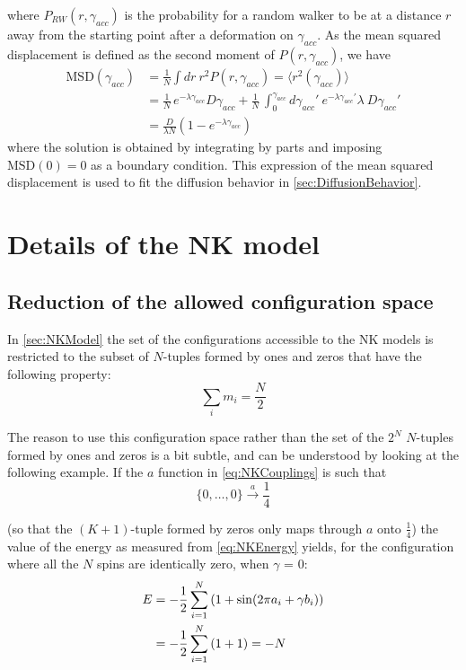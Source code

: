 where $P_{RW}(r, \gamma_{acc})$ is the probability for a random walker to be at a distance $r$ away from the starting point after a deformation on $\gamma_{acc}$.
As the mean squared displacement is defined as the second moment of $P(r,\gamma_{acc})$, we have 
\begin{align}
	\text{MSD}(\gamma_{acc})	&= \frac{1}{N} \int dr\ r^{2} P(r,\gamma_{acc}) = \langle r^{2}(\gamma_{acc}) \rangle \\
								&= \frac{1}{N}\, e^{-\lambda \gamma_{acc}} D \gamma_{acc} + \frac{1}{N}\, \int_{0}^{\gamma_{acc}} d\gamma_{acc}'\ e^{-\lambda \gamma_{acc}'} \lambda\ D \gamma_{acc}' \\
								&= \frac{D}{\lambda N} (1 - e^{-\lambda \gamma_{acc}})
\end{align}
where the solution is obtained by integrating by parts and imposing $\text{MSD}(0) = 0$ as a boundary condition. This expression of the mean squared displacement is used to fit the diffusion behavior in \autoref{sec:DiffusionBehavior}.

\chapter{Details of the NK model \label{app:NKDetails}}

\section*{Reduction of the allowed configuration space}

In \autoref{sec:NKModel} the set of the configurations accessible to the NK models is restricted to the subset of $N$-tuples formed by ones and zeros that have the following property:
\begin{equation}
    \sum_{i} m_{i} = \frac{N}{2}
    \label{eq:NKConstraint}
\end{equation}

The reason to use this configuration space rather than the set of the $2^{N}$ $N$-tuples formed by ones and zeros is a bit subtle, and can be understood by looking at the following example. 
If the $a$ function in \autoref{eq:NKCouplings} is such that
\begin{equation}
    \{0, \ldots, 0\} \xrightarrow{a} \frac{1}{4}
    \label{eq:PathologicNKCoupling}
\end{equation}

(so that the $(K+1)$-tuple formed by zeros only maps through $a$ onto $\frac{1}{4}$) the value of the energy as measured from \autoref{eq:NKEnergy} yields, for the configuration where all the $N$ spins are identically zero, when $\gamma$ = 0:
\begin{align}
    E   &= -\frac{1}{2} \sum_{i = 1}^{N} \left( 1 + \sin(2 \pi a_{i} + \gamma b_{i} \right)) \notag \\
        &= -\frac{1}{2} \sum_{i = 1}^{N} \left( 1 + 1 \right) = - N
    \label{eq:PathologicNKEnergy}
\end{align} 

